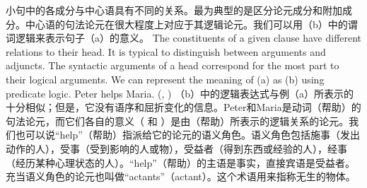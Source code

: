 小句中的各成分与中心语具有不同的关系。最为典型的是区分论元成分和附加成分。中心语的句法论元在很大程度上对应于其逻辑论元。我们可以用（b）中的谓词逻辑来表示句子（a）的意义。
The constituents of a given clause have different relations to their head.
It is typical to distinguish between arguments and adjuncts. The syntactic arguments
of a head correspond for the most part to their logical arguments. We can represent the meaning of (a)
as (b) using predicate logic.
\eal
\ex Peter helps Maria.
\ex {}(, )
\zl
（b）中的逻辑表达式与例（a）所表示的十分相似；但是，它没有语序和屈折变化的信息。Peter和Maria是动词（帮助）的句法论元，而它们各自的意义（ 和 ）是由（帮助）所表示的逻辑关系的论元。我们也可以说“help”（帮助）指派给它的论元的语义角色。语义角色包括施事（发出动作的人），受事（受到影响的人或物），受益者（得到东西或经验的人），经事（经历某种心理状态的人）。“help”（帮助）的主语是事实，直接宾语是受益者。充当语义角色的论元也叫做“actants”（actant）。这个术语用来指称无生的物体。

